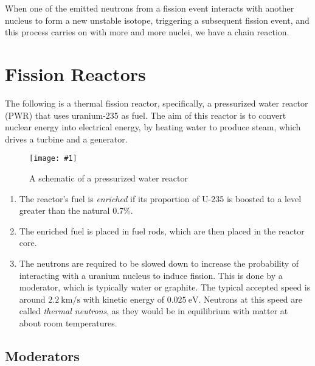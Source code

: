 \documentclass[a4paper,12pt]{article}
\let\oldsection\section
\renewcommand\section{\clearpage\oldsection}
\newcommand{\img}[4]{\begin{center}
  \begin{figure}[H]
    \centering
    \texttt{[image: \#1]}
    \caption{#3}
    \label{fig:#4}
  \end{figure}
\end{center}}
\begin{document}
When one of the emitted neutrons from a fission event interacts with another nucleus to form a new unstable isotope, triggering a subsequent fission event, and this process carries on with more and more nuclei, we have a chain reaction.

\section{Fission Reactors}

The following is a thermal fission reactor, specifically, a pressurized water reactor (PWR) that uses uranium-235 as fuel. The aim of this reactor is to convert nuclear energy into electrical energy, by heating water to produce steam, which drives a turbine and a generator.

\img{reactor.png}{1}{A schematic of a pressurized water reactor}{reactor}

\begin{enumerate}
  \item The reactor's fuel is \textit{enriched} if its proportion of U-235 is boosted to a level greater than the natural 0.7\%.

  \item The enriched fuel is placed in fuel rods, which are then placed in the reactor core.

  \item The neutrons are required to be slowed down to increase the probability of interacting with a uranium nucleus to induce fission. This is done by a moderator, which is typically water or graphite. The typical accepted speed is around $\SI{2.2}{\km\per\s}$ with kinetic energy of $\SI{0.025}{\eV}$. Neutrons at this speed are called \textit{thermal neutrons}, as they would be in equilibrium with matter at about room temperatures.
\end{enumerate}

\subsection{Moderators}
\end{document}
